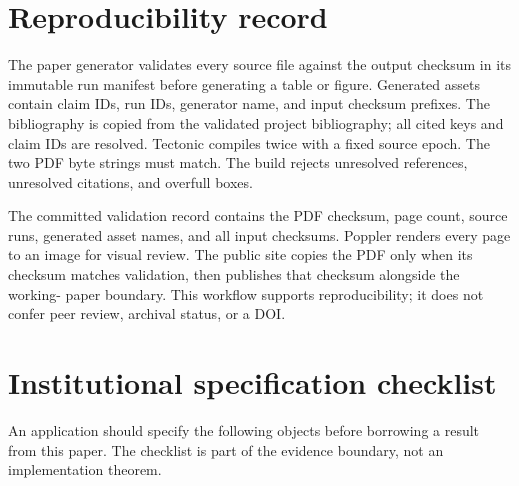 \documentclass[11pt]{article}
\begin{document}
\section{Reproducibility record}

The paper generator validates every source file against the output checksum in
its immutable run manifest before generating a table or figure. Generated
assets contain claim IDs, run IDs, generator name, and input checksum prefixes.
The bibliography is copied from the validated project bibliography; all cited
keys and claim IDs are resolved. Tectonic compiles twice with a fixed source
epoch. The two PDF byte strings must match. The build rejects unresolved
references, unresolved citations, and overfull boxes.

The committed validation record contains the PDF checksum, page count, source
runs, generated asset names, and all input checksums. Poppler renders every page
to an image for visual review. The public site copies the PDF only when its
checksum matches validation, then publishes that checksum alongside the working-
paper boundary. This workflow supports reproducibility; it does not confer peer
review, archival status, or a DOI.

\clearpage
\section{Institutional specification checklist}

An application should specify the following objects before borrowing a result
from this paper. The checklist is part of the evidence boundary, not an
implementation theorem.
\end{document}
